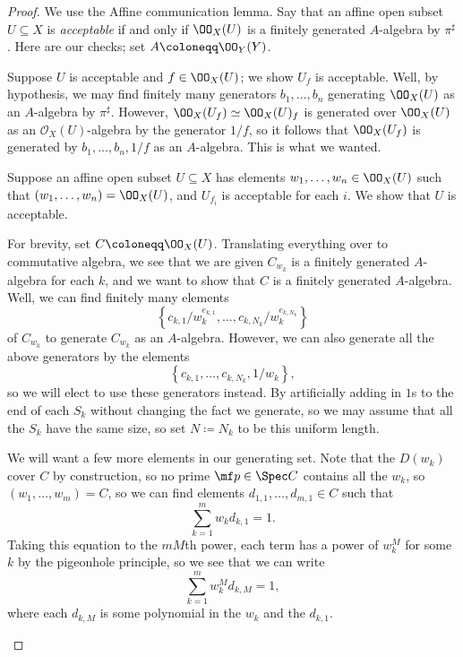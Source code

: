 \documentclass[../notes.tex]{subfiles}
\begin{document}
\begin{proof}
	We use the Affine communication lemma. Say that an affine open subset $U\subseteq X$ is \textit{acceptable} if and only if $\OO_X(U)$ is a finitely generated $A$-algebra by $\pi^\sharp$. Here are our checks; set $A\coloneqq\OO_Y(Y)$.
	\begin{listroman}
		\item Suppose $U$ is acceptable and $f\in\OO_X(U)$; we show $U_f$ is acceptable. Well, by hypothesis, we may find finitely many generators $b_1,\ldots,b_n$ generating $\OO_X(U)$ as an $A$-algebra by $\pi^\sharp$. However, $\OO_X(U_f)\simeq\OO_X(U)_f$ is generated over $\OO_X(U)$ as an $\mathcal O_X(U)$-algebra by the generator $1/f$, so it follows that $\OO_X(U_f)$ is generated by $b_1,\ldots,b_n,1/f$ as an $A$-algebra. This is what we wanted.
		\item Suppose an affine open subset $U\subseteq X$ has elements $w_1,\ldots,w_n\in\OO_X(U)$ such that $(w_1,\ldots,w_n)=\OO_X(U)$, and $U_{f_i}$ is acceptable for each $i$. We show that $U$ is acceptable.

		For brevity, set $C\coloneqq\OO_X(U)$. Translating everything over to commutative algebra, we see that we are given $C_{w_k}$ is a finitely generated $A$-algebra for each $k$, and we want to show that $C$ is a finitely generated $A$-algebra. Well, we can find finitely many elements
		\[\left\{c_{k,1}/w_k^{e_{k,1}},\ldots,c_{k,N_k}/w_k^{e_{k,N_k}}\right\}\]
		of $C_{w_k}$ to generate $C_{w_k}$ as an $A$-algebra. However, we can also generate all the above generators by the elements
		\[\left\{c_{k,1},\ldots,c_{k,N_k},1/w_k\right\},\]
		so we will elect to use these generators instead. By artificially adding in $1$s to the end of each $S_k$ without changing the fact we generate, so we may assume that all the $S_k$ have the same size, so set $N\coloneqq N_k$ to be this uniform length.
	
		We will want a few more elements in our generating set. Note that the $D(w_k)$ cover $C$ by construction, so no prime $\mf p\in\Spec C$ contains all the $w_k$, so $(w_1,\ldots,w_m)=C$, so we can find elements $d_{1,1},\ldots,d_{m,1}\in C$ such that
		\[\sum_{k=1}^mw_kd_{k,1}=1.\]
		Taking this equation to the $mM$th power, each term has a power of $w_k^M$ for some $k$ by the pigeonhole principle, so we see that we can write
		\[\sum_{k=1}^mw_k^Md_{k,M}=1,\]
		where each $d_{k,M}$ is some polynomial in the $w_k$ and the $d_{k,1}$.
	

\end{listroman}
\end{proof}
\end{document}
